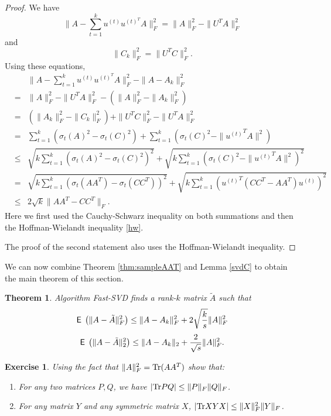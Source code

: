 \documentclass{book}
\newtheorem{theorem}{Theorem}[chapter]
\newtheorem{exercise}{Exercise}
\numberwithin{exercise}{chapter}
\begin{document}
\begin{proof}
We have
\[
\|A-\sum_{t=1}^k u^{(t)}u^{(t)^T}A\|_F^2=\|A\|_F^2 - \|U^TA\|_F^2
\]
and
\[
\|C_k\|_F^2 = \|U^TC\|_F^2.
\]
Using these equations,
\begin{eqnarray*}
&&\|A-\sum_{t=1}^k u^{(t)}u^{(t)^T}A\|_F^2 - \|A-A_k\|_F^2 \\
&=&\|A\|_F^2 - \|U^TA\|_F^2 - (\|A\|_F^2 - \|A_k\|_F^2)\\
&=&\left(\|A_k\|_F^2- \|C_k\|_F^2\right)+\|U^TC\|_F^2-\|U^TA\|_F^2\\
&=&\sum_{t=1}^k\left(\sigma_t(A)^2 - \sigma_t(C)^2\right)
+\sum_{t=1}^k\left(\sigma_t(C)^2-\|{u^{(t)}}^TA\|^2\right)\\
&\le&\sqrt{k\sum_{t=1}^k\left(\sigma_t(A)^2 - \sigma_t(C)^2\right)^2}+\sqrt{k\sum_{t=1}^k\left(\sigma_t(C)^2-\|{u^{(t)}}^TA\|^2\right)^2}\\
&=& \sqrt{k\sum_{t=1}^k\left(\sigma_t(AA^T) - \sigma_t(CC^T)\right)^2}+\sqrt{k\sum_{t=1}^k\left({u^{(t)}}^T(CC^T-AA^T)u^{(t)}\right)^2}\\
&\le& 2\sqrt{k}\|AA^T-CC^T\|_F.
\end{eqnarray*}
Here we first used the Cauchy-Schwarz inequality on both summations and then the Hoffman-Wielandt inequality \ref{hw}.

The proof of the second statement also uses the Hoffman-Wielandt inequality.
\end{proof}

We can now combine Theorem \ref{thm:sampleAAT} and Lemma \ref{svdC} to obtain the main theorem of this section.
\begin{theorem}
Algorithm Fast-SVD finds a rank-$k$ matrix $\tilde{A}$ such that
$$\hbox{{\sf E}\;}\left(\|A-\tilde{A}\|_F^2\right)\leq \|A-A_k\|_F^2+2\sqrt{\frac{k}{s}}\|A\|_F^2$$
$$\hbox{{\sf E}\;}\left(\|A-\tilde{A}\|_2^2\right)\leq \|A-A_k\|_2+\frac{2}{\sqrt{s}}\|A\|_F^2.$$
\end{theorem}


\begin{exercise}\label{trace-norm}
Using the fact that $\|A\|_F^2 = \hbox{Tr}(AA^T)$ show that:
\begin{enumerate}
\item For any two matrices $P,Q$, we have $|\hbox{Tr} PQ|\leq \|P\|_F\|Q\|_F$.
\item For any matrix $Y$ and any symmetric matrix $X$, $|\hbox{Tr} XYX|\leq \|X\|_F^2\|Y\|_F$.
\end{enumerate}
\end{exercise}
\end{document}
